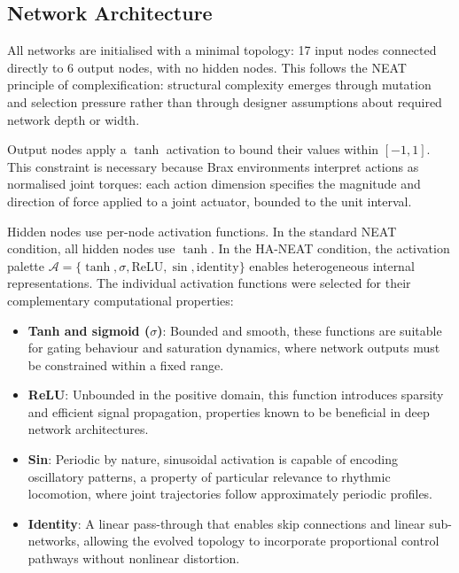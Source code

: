 \documentclass[12pt]{article}
\begin{document}
\subsection{Network Architecture}
\label{subsec:network-architecture}

All networks are initialised with a minimal topology: 17 input nodes connected directly to 6 output nodes, with no hidden nodes.
This follows the NEAT principle of complexification: structural complexity emerges through mutation and selection pressure rather than through designer assumptions about required network depth or width.

Output nodes apply a $\tanh$ activation to bound their values within $[-1, 1]$.
This constraint is necessary because Brax environments interpret actions as normalised joint torques: each action dimension specifies the magnitude and direction of force applied to a joint actuator, bounded to the unit interval.

Hidden nodes use per-node activation functions.
In the standard NEAT condition, all hidden nodes use $\tanh$.
In the HA-NEAT condition, the activation palette $\mathcal{A} = \{\tanh, \sigma, \text{ReLU}, \sin, \text{identity}\}$ enables heterogeneous internal representations.
The individual activation functions were selected for their complementary computational properties:

\begin{itemize}
    \item \textbf{Tanh and sigmoid ($\sigma$)}: Bounded and smooth, these functions are suitable for gating behaviour and saturation dynamics, where network outputs must be constrained within a fixed range.
    \item \textbf{ReLU}: Unbounded in the positive domain, this function introduces sparsity and efficient signal propagation, properties known to be beneficial in deep network architectures.
    \item \textbf{Sin}: Periodic by nature, sinusoidal activation is capable of encoding oscillatory patterns, a property of particular relevance to rhythmic locomotion, where joint trajectories follow approximately periodic profiles.
    \item \textbf{Identity}: A linear pass-through that enables skip connections and linear sub-networks, allowing the evolved topology to incorporate proportional control pathways without nonlinear distortion.
\end{itemize}

\end{document}
